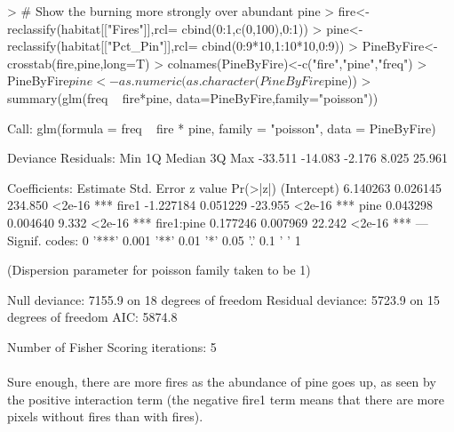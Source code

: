 \documentclass{article}
\begin{document}
\begin{Schunk}
\begin{Sinput}
> # Show the burning more strongly over abundant pine
> fire<-reclassify(habitat[["Fires"]],rcl= cbind(0:1,c(0,100),0:1))
> pine<-reclassify(habitat[["Pct_Pin"]],rcl= cbind(0:9*10,1:10*10,0:9))
> PineByFire<-crosstab(fire,pine,long=T)
> colnames(PineByFire)<-c("fire","pine","freq")
> PineByFire$pine <- as.numeric(as.character(PineByFire$pine))
> summary(glm(freq ~ fire*pine, data=PineByFire,family="poisson"))
\end{Sinput}
\begin{Soutput}
Call:
glm(formula = freq ~ fire * pine, family = "poisson", data = PineByFire)

Deviance Residuals: 
    Min       1Q   Median       3Q      Max  
-33.511  -14.083   -2.176    8.025   25.961  

Coefficients:
             Estimate Std. Error z value Pr(>|z|)    
(Intercept)  6.140263   0.026145 234.850   <2e-16 ***
fire1       -1.227184   0.051229 -23.955   <2e-16 ***
pine         0.043298   0.004640   9.332   <2e-16 ***
fire1:pine   0.177246   0.007969  22.242   <2e-16 ***
---
Signif. codes:  0 '***' 0.001 '**' 0.01 '*' 0.05 '.' 0.1 ' ' 1

(Dispersion parameter for poisson family taken to be 1)

    Null deviance: 7155.9  on 18  degrees of freedom
Residual deviance: 5723.9  on 15  degrees of freedom
AIC: 5874.8

Number of Fisher Scoring iterations: 5
\end{Soutput}
\end{Schunk}

\paragraph{}
Sure enough, there are more fires as the abundance of pine goes up, as seen by the positive interaction term (the negative fire1 term means that there are more pixels without fires than with fires).
\end{document}

